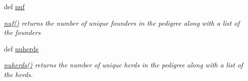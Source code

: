 \begin{DoxyCompactItemize}
def \hyperlink{classPyPedal_1_1pyp__newclasses_1_1PedigreeMetadata_a2fa68d278b69bda83c344c5f0615e25c}{nuf}
\begin{DoxyCompactList}\small\item\em \hyperlink{classPyPedal_1_1pyp__newclasses_1_1PedigreeMetadata_a2fa68d278b69bda83c344c5f0615e25c}{nuf()} returns the number of unique founders in the pedigree along with a list of the founders \item\end{DoxyCompactList}\item 
def \hyperlink{classPyPedal_1_1pyp__newclasses_1_1PedigreeMetadata_ae408f6ef90563175d0069238dfd55f1b}{nuherds}
\begin{DoxyCompactList}\small\item\em \hyperlink{classPyPedal_1_1pyp__newclasses_1_1PedigreeMetadata_ae408f6ef90563175d0069238dfd55f1b}{nuherds()} returns the number of unique herds in the pedigree along with a list of the herds. \item\end{DoxyCompactList}\end{DoxyCompactItemize}
